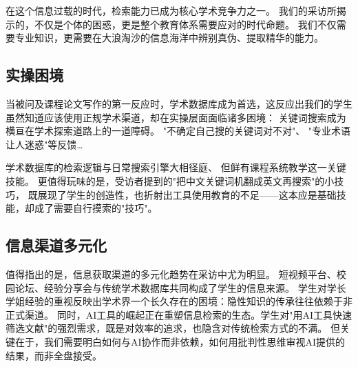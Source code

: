 在这个信息过载的时代，检索能力已成为核心学术竞争力之一。
我们的采访所揭示的，不仅是个体的困惑，更是整个教育体系需要应对的时代命题。
我们不仅需要专业知识，更需要在大浪淘沙的信息海洋中辨别真伪、提取精华的能力。

\subsection{实操困境}
当被问及课程论文写作的第一反应时，学术数据库成为首选，这反应出我们的学生虽然知道应该使用正规学术渠道，却在实操层面面临诸多困境：
关键词搜索成为横亘在学术探索道路上的一道障碍。
"不确定自己搜的关键词对不对"、
"专业术语让人迷惑"等反馈\dots

学术数据库的检索逻辑与日常搜索引擎大相径庭、
但鲜有课程系统教学这一关键技能。
更值得玩味的是，受访者提到的"把中文关键词机翻成英文再搜索"的小技巧，
既展现了学生的创造性，也折射出工具使用教育的不足——这本应是基础技能，却成了需要自行摸索的"技巧"。

\subsection{信息渠道多元化}
值得指出的是，信息获取渠道的多元化趋势在采访中尤为明显。
短视频平台、校园论坛、经验分享会与传统学术数据库共同构成了学生的信息来源。
学生对学长学姐经验的重视反映出学术界一个长久存在的困境：隐性知识的传承往往依赖于非正式渠道。
同时，AI工具的崛起正在重塑信息检索的生态。学生对"用AI工具快速筛选文献"的强烈需求，既是对效率的追求，也隐含对传统检索方式的不满。
但关键在于，我们需要明白如何与AI协作而非依赖，如何用批判性思维审视AI提供的结果，而非全盘接受。

